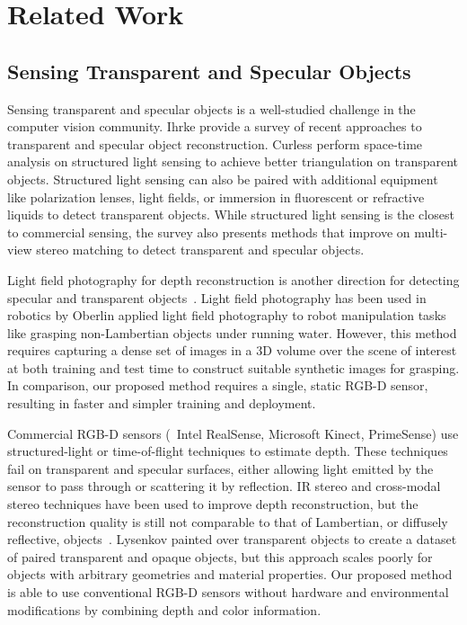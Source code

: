 \section{Related Work}
\label{sec:related}

\subsection{Sensing Transparent and Specular Objects}

Sensing transparent and specular objects is a well-studied challenge in the computer vision community. 
Ihrke \etal\cite{ihrke2010transparent} provide a survey of recent approaches to transparent and specular object reconstruction.
Curless \etal\cite{curless1995better} perform space-time analysis on structured light sensing to achieve better triangulation on transparent objects.
Structured light sensing can also be paired with additional equipment like polarization lenses, light fields, or immersion in fluorescent or refractive liquids to detect transparent objects.
While structured light sensing is the closest to commercial sensing, the survey also presents methods that improve on multi-view stereo matching to detect transparent and specular objects.

Light field photography for depth reconstruction is another direction for detecting specular and transparent objects~\cite{6619203,wetzstein2011hand}. 
Light field photography has been used in robotics by 
Oberlin \etal\cite{oberlintime} applied light field photography to robot manipulation tasks like grasping non-Lambertian objects under running water.
However, this method requires capturing a dense set of images in a 3D volume over the scene of interest at both training and test time to construct suitable synthetic images for grasping.
In comparison, our proposed method requires a single, static RGB-D sensor, resulting in faster and simpler training and deployment.

Commercial RGB-D sensors (\eg~Intel RealSense, Microsoft Kinect, PrimeSense) use structured-light or time-of-flight techniques to estimate depth.
These techniques fail on transparent and specular surfaces, either allowing light emitted by the sensor to pass through or scattering it by reflection.
IR stereo and cross-modal stereo techniques have been used to improve depth reconstruction, but the reconstruction quality is still not comparable to that of Lambertian, or diffusely reflective, objects~\cite{alhwarin2014ir, chiu2011improving, mahler2018guest}. 
Lysenkov \etal\cite{lysenkov2013recognition, lysenkov2013pose} painted over transparent objects to create a dataset of paired transparent and opaque objects, but this approach scales poorly for objects with arbitrary geometries and material properties.
Our proposed method is able to use conventional RGB-D sensors without hardware and environmental modifications by combining depth and color information. 

